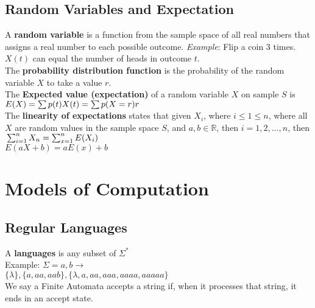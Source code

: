 \documentclass[letter]{article}
\begin{document}
\begin{multicols}{2}
  \subsection{Random Variables and Expectation} 
  A \textbf{random variable} is a function from the sample space of all real
  numbers that assigns a real number to each possible outcome.
  \textit{Example}: Flip a coin $3$ times. $X(t)$ can equal the number of heads
  in outcome $t$. \\
  The \textbf{probability distribution function} is the probability of the
  random variable $X$ to take a value $r$. \\
  The \textbf{Expected value (expectation)} of a random variable $X$ on sample
  $S$ is
  $\\E(X) = \sum p(t)X(t) = \sum p(X = r)r$\\
  The \textbf{linearity of expectations} states that given $X_i$, where
  $i \leq 1 \leq n$, where all $X$ are random values in the sample space $S$,
  and $a, b \in \mathbb{R}$, then
  $i = 1, 2, \ldots, n$, then
  $\\\sum_{i = 1}^n X_n = \sum_{x = 1}^n E(X_i)$\\
  $E(aX + b) = aE(x) + b$

  \section{Models of Computation} 

  \subsection{Regular Languages} 
  A \textbf{languages} is any subset of $\Sigma^*$\\
  Example: $\Sigma = {a, b} \rightarrow $ \\
  $\{\lambda\}, \{a, aa, aab\}, \{\lambda, a, aa, aaa, aaaa, aaaaa\}$ \\
  We say a Finite Automata accepts a string if, when it processes that
          string, it ends in an accept state.


\end{multicols}
\end{document}
